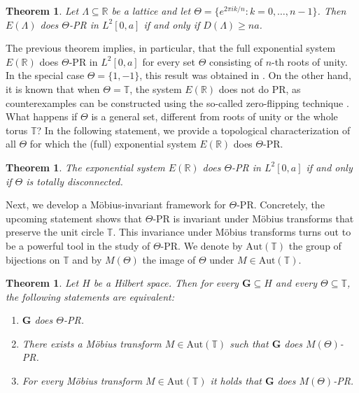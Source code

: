 \documentclass[reqno,a4paper,11pt]{amsart}
\numberwithin{equation}{section}
\newtheorem{theorem}[definition]{Theorem}
\def\R{{\mathbb R}}
\def\T{{\mathbb T}}
\newcommand\1{\mathds{1}}
\begin{document}
\begin{theorem}\label{thm:lattice_density_characterization}
    Let $\Lambda \subseteq \R$ be a lattice and let $\Theta = \{ e^{2\pi i k/n} : k=0,\dots,n-1 \}$. Then $E(\Lambda)$ does $\Theta$-PR in $L^2[0,a]$ if and only if $D(\Lambda) \geq na$.
\end{theorem}

The previous theorem implies, in particular, that the full exponential system $E(\mathbb{R})$ does $\Theta$-PR in $L^{2}[0,a]$ for every set $\Theta$ consisting of $n$-th roots of unity. In the special case $\Theta = \{1,-1\}$, this result was  obtained in \cite{thakur2011reconstruction}. On the other
hand, it is known that when $\Theta = \mathbb{T}$, the system $E(\mathbb{R})$ does not do PR, as counterexamples can be constructed using the so-called zero-flipping technique \cite{akutowicz1956determination}. What happens if $\Theta$ is a general set, different from roots of unity or the whole torus $\T$? In the following statement, we provide a topological characterization of all $\Theta$ for which the (full) exponential system $E(\mathbb{R})$ does $\Theta$-PR.

\begin{theorem}\label{thm:ER_disconnected}
    The exponential system $E(\R)$ does $\Theta$-PR in $L^2[0,a]$ if and only if $\Theta$ is totally disconnected.
\end{theorem}

Next, we develop a Möbius-invariant framework for $\Theta$-PR. Concretely, the upcoming statement shows that $\Theta$-PR is invariant under Möbius transforms that preserve the unit circle $\T$. This invariance under Möbius transforms turns out to be a powerful tool in the study of $\Theta$-PR. We denote by $\mathrm{Aut}(\T)$ the group of bijections on $\T$ and by $M(\Theta)$ the image of $\Theta$ under $M \in \mathrm{Aut}(\T)$.

\begin{theorem}\label{thm:mbs}
    Let $H$ be a Hilbert space. Then for every $\mathbf{G} \subseteq H$ and every $\Theta \subseteq \T$, the following statements are equivalent:
    \begin{enumerate}
        \item $\mathbf{G}$ does $\Theta$-PR.
        \item There exists a Möbius transform $M\in\mathrm{Aut}(\T)$ such that $\mathbf{G}$ does $M(\Theta)$-PR.
        \item For every Möbius transform $M\in\mathrm{Aut}(\T)$ it holds that $\mathbf{G}$ does $M(\Theta)$-PR.
    \end{enumerate}
\end{theorem}
\end{document}
